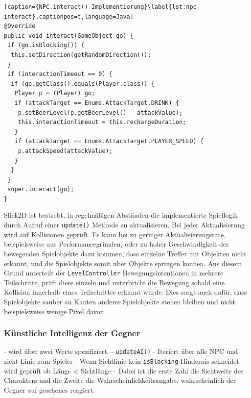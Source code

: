 \begin{lstlisting}[caption={NPC.interact() Implementierung}\label{lst:npc-interact},captionpos=t,language=Java]
@Override
public void interact(GameObject go) {
 if (go.isBlocking()) {
  this.setDirection(getRandomDirection());
 }
 if (interactionTimeout == 0) {
  if (go.getClass().equals(Player.class)) {
   Player p = (Player) go;
   if (attackTarget == Enums.AttackTarget.DRINK) {
    p.setBeerLevel(p.getBeerLevel() - attackValue);
    this.interactionTimeout = this.rechargeDuration;
   }
   if (attackTarget == Enums.AttackTarget.PLAYER_SPEED) {
    p.attackSpeed(attackValue);
   }
  }
 }
 super.interact(go);
}

\end{lstlisting}

Slick2D ist bestrebt, in regelmäßigen Abständen die implementierte Spiellogik durch Aufruf einer \texttt{update()} Methode zu aktualisieren.
Bei jeder Aktualisierung wird auf Kollisionen geprüft.
Es kann bei zu geringer Aktualisierungsrate, beispielsweise aus Performancegründen, oder zu hoher Geschwindigkeit der bewegenden Spielobjekte dazu kommen, dass einzelne Treffer mit Objekten nicht erkannt, und die Spielobjekte somit über Objekte springen können.
Aus diesem Grund unterteilt der \texttt{LevelController} Bewegungsintentionen in mehrere Teilschritte, prüft diese einzeln und unterbricht die Bewegung sobald eine Kollision innerhalb eines Teilschrittes erkannt wurde.
Dies sorgt auch dafür, dass Spielobjekte sauber an Kanten anderer Spielobjekte stehen bleiben und nicht beispielsweise wenige Pixel davor.


\subsubsection{Künstliche Intelligenz der Gegner}
- wird über zwei Werte spezifiziert.
- \texttt{updateAI()}
- Iteriert über alle NPC und zieht Linie zum Spieler
- Wenn Sichtlinie kein \texttt{isBlocking} Hindernis schneidet wird geprüft ob Länge < Sichtlänge
- Dabei ist die erste Zahl die Sichtweite des Charakters und die Zweite die Wahrscheinlichkeitsangabe, wahrscheinlich der Gegner auf gesehenes reagiert.
